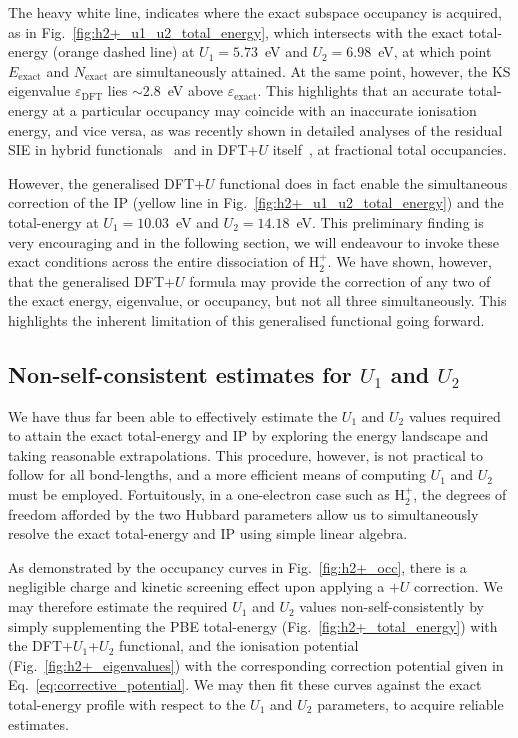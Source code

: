 The heavy white line, 
indicates where the exact 
subspace occupancy is acquired, 
as in Fig.~\ref{fig:h2+_u1_u2_total_energy}, 
which intersects with the exact total-energy 
(orange dashed line) 
at  $U_1=5.73$~eV and  $U_2=6.98$~eV,
at which point 
$E_\textrm{exact}$ and $N_\textrm{exact}$
are simultaneously attained.
%
At the same point, however, 
the KS eigenvalue 
$\varepsilon_\textrm{DFT}$
lies $\sim 2.8$~eV above $\varepsilon_\textrm{exact}$.
%
This highlights that an accurate total-energy 
at a particular occupancy 
may coincide with an inaccurate ionisation energy, 
and vice versa,
as was recently shown in detailed analyses 
of the residual SIE in hybrid 
functionals~\cite{PhysRevB.94.035140}
and in DFT+$U$ itself~\cite{:/content/aip/journal/jcp/145/5/10.1063/1.4959882}, 
at fractional total occupancies.

However, 
the generalised DFT+$U$ functional 
does in fact enable the simultaneous correction of the IP 
(yellow line in  Fig.~\ref{fig:h2+_u1_u2_total_energy}) 
and the total-energy at 
$U_1=10.03$~eV and $U_2=14.18$~eV.
%
This preliminary finding is very encouraging
and in the following section, 
we will endeavour to invoke 
these exact conditions 
across the entire dissociation of H$_2^+$.
%
We have shown, however, 
that the generalised DFT+$U$ formula 
may provide the correction of any two of 
the exact energy, eigenvalue, or occupancy,  
but not all three simultaneously.
%
This {highlights} the inherent limitation 
of this generalised functional going forward.


\subsection{Non-self-consistent estimates for {$U_1$} and  {$U_2$}}
\label{sec:calculating_u1+u2}

We have thus far been able 
to effectively estimate  
the $U_1$ and $U_2$ values 
required to attain the 
exact total-energy and IP 
by exploring the energy landscape and 
taking reasonable extrapolations.
%
This procedure, however, 
is not practical to follow for all bond-lengths, 
and a more efficient means of computing 
$U_1$ and $U_2$ must be employed.
%
Fortuitously, 
in a one-electron case such as H$_2^+$, 
the degrees of freedom afforded by 
the two Hubbard parameters  
allow us to simultaneously 
resolve the exact total-energy and IP 
using simple linear algebra.

As demonstrated by the  
occupancy curves in Fig.~\ref{fig:h2+_occ}, 
there is a negligible charge and kinetic screening effect
upon applying a $+U$ correction.
%
We may therefore estimate the required 
$U_1$ and $U_2$ values non-self-consistently  
by simply supplementing the PBE total-energy 
(Fig.~\ref{fig:h2+_total_energy})
with the DFT+$U_1$+$U_2$  functional, 
and the ionisation potential 
(Fig.~\ref{fig:h2+_eigenvalues}) 
with the corresponding correction potential 
given in Eq.~\eqref{eq:corrective_potential}.
%
We may then fit these curves 
against the exact total-energy profile 
with respect to the 
$U_1$ and $U_2$ parameters, 
to acquire reliable estimates.

